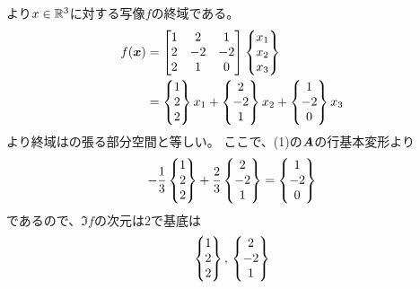 \begin{ans*}
\begin{enumerate}[label=(\arabic*)]
    より$x\in\mathbb{R}^3$に対する写像$f$の終域である。
    \begin{align}
      f({\bm{x}})
      &= \begin{bmatrix}
        1 & 2 & 1 \\
        2 & -2 & -2 \\
        2 & 1 & 0
      \end{bmatrix} \begin{Bmatrix}x_1 \\ x_2 \\ x_3\end{Bmatrix}\\
      &=
      \begin{Bmatrix}1 \\ 2 \\ 2\end{Bmatrix} x_1
      +\begin{Bmatrix}2 \\ -2 \\ 1\end{Bmatrix} x_2
      +\begin{Bmatrix}1 \\ -2 \\ 0\end{Bmatrix} x_3
    \end{align}
    より終域はの張る部分空間と等しい。
    ここで、(1)の$\bm{A}$の行基本変形より
    \begin{gather}
      -\frac{1}{3}\begin{Bmatrix}1 \\ 2 \\ 2\end{Bmatrix}
      +\frac{2}{3}\begin{Bmatrix}2 \\ -2 \\ 1\end{Bmatrix}
      =\begin{Bmatrix}1 \\ -2 \\ 0\end{Bmatrix}
    \end{gather}
    であるので、$\Im f$の次元は$2$で基底は
    \begin{gather}
      \begin{Bmatrix}1 \\ 2 \\ 2\end{Bmatrix},\,
      \begin{Bmatrix}2 \\ -2 \\ 1\end{Bmatrix}
    \end{gather}
  \end{enumerate}
\end{ans*}

